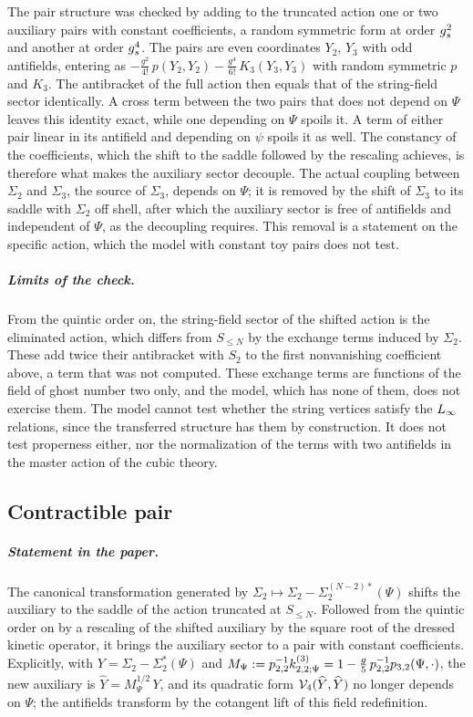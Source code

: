 The pair structure was checked by adding to the truncated action one or two auxiliary pairs with constant coefficients, a random symmetric form at order $g_s^2$ and another at order $g_s^4$.
The pairs are even coordinates $Y_2$, $Y_3$ with odd antifields, entering as $- \tfrac{g^2}{4!} \, p(Y_2, Y_2) - \tfrac{g^4}{6!} \, K_3(Y_3, Y_3)$ with random symmetric $p$ and $K_3$.
The antibracket of the full action then equals that of the string-field sector identically.
A cross term between the two pairs that does not depend on $\Psi$ leaves this identity exact, while one depending on $\Psi$ spoils it.
A term of either pair linear in its antifield and depending on $\psi$ spoils it as well.
The constancy of the coefficients, which the shift to the saddle followed by the rescaling achieves, is therefore what makes the auxiliary sector decouple.
The actual coupling between $\Sigma_2$ and $\Sigma_3$, the source of $\Sigma_3$, depends on $\Psi$; it is removed by the shift of $\Sigma_3$ to its saddle with $\Sigma_2$ off shell, after which the auxiliary sector is free of antifields and independent of $\Psi$, as the decoupling requires.
This removal is a statement on the specific action, which the model with constant toy pairs does not test.

\subparagraph{Limits of the check.}
From the quintic order on, the string-field sector of the shifted action is the eliminated action, which differs from $S_{\le N}$ by the exchange terms induced by $\Sigma_2$.
These add twice their antibracket with $S_2$ to the first nonvanishing coefficient above, a term that was not computed.
These exchange terms are functions of the field of ghost number two only, and the model, which has none of them, does not exercise them.
The model cannot test whether the string vertices satisfy the $L_\infty$ relations, since the transferred structure has them by construction.
It does not test properness either, nor the normalization of the terms with two antifields in the master action of the cubic theory.

\subsection{Contractible pair}
\label{fdm:sec:pair}

\subparagraph{Statement in the paper.}
The canonical transformation generated by $\Sigma_2 \mapsto \Sigma_2 - \Sigma_2^{(N-2)*}(\Psi)$ shifts the auxiliary to the saddle of the action truncated at $S_{\le N}$.
Followed from the quintic order on by a rescaling of the shifted auxiliary by the square root of the dressed kinetic operator, it brings the auxiliary sector to a pair with constant coefficients.
Explicitly, with $Y = \Sigma_2 - \Sigma_2^*(\Psi)$ and $M_\Psi := \sprod{2}{2}^{-1} \kin{2}{\Psi}{3} = 1 - \tfrac{g}{5} \, \sprod{2}{2}^{-1} \sprod{3}{2}(\Psi, \cdot)$, the new auxiliary is $\widehat Y = M_\Psi^{1/2} \, Y$, and its quadratic form $\mathcal{V}_{4}(\widehat Y, \widehat Y)$ no longer depends on $\Psi$; the antifields transform by the cotangent lift of this field redefinition.

